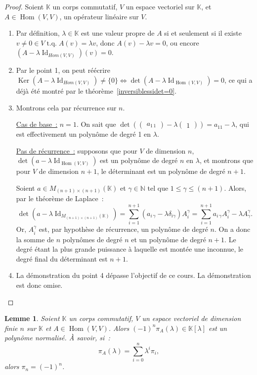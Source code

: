 \documentclass{article}
\DeclareMathOperator{\tq}{\text{ t.q. }}
\DeclareMathOperator{\Id}{Id}
\DeclareMathOperator{\Ker}{Ker}
\DeclareMathOperator{\Hom}{Hom}
\newcommand{\N}{\mathbb N}
\newcommand{\K}{\mathbb K}
\newcommand{\M}[3]{M_{#1 \times #2}(#3)}
\newtheorem{lem}[thm]{Lemme}
\theoremstyle{definition}
\theoremstyle{remark}
\begin{document}
		\begin{proof} Soient $\K$ un corps commutatif, $V$ un espace vectoriel sur $\K$, et $A \in \Hom(V, V)$, un opérateur linéaire sur $V$.

		\begin{enumerate}
			\item Par définition, $\lambda \in \K$ est une valeur propre de $A$ si et seulement si il existe $v \neq 0 \in V \tq A(v) = \lambda v$, donc
			      $A(v) - \lambda v = 0$, ou encore $(A - \lambda\Id_{Hom(V, V)})(v) = 0$.
			\item Par le point 1, on peut réécrire $\Ker(A - \lambda\Id_{Hom(V, V)}) \neq \{0\} \iff \det(A - \lambda \Id_{\Hom(V, V)}) = 0$, ce qui a déjà été montré
			      par le théorème~\ref{inversiblessidet=0}.
			\item Montrons cela par récurrence sur $n$.

			      \underline{Cas de base~:} $n = 1$. On sait que
				  $\det\left(\begin{pmatrix}a_{1\,1}\end{pmatrix} - \lambda\begin{pmatrix}1\end{pmatrix}\right) = a_11 - \lambda$, qui est effectivement un polynôme
				  de degré 1 en $\lambda$.

				  \underline{Pas de récurrence~:} supposons que pour $V$ de dimension $n$, $\det(a - \lambda \Id_{\Hom(V, V)})$ est un polynôme de degré $n$
				  en $\lambda$, et montrons que pour $V$ de dimension $n+1$, le déterminant est un polynôme de degré $n+1$.

				  Soient $a \in \M {(n+1)}{(n+1)}\K$ et $\gamma \in \N$ tel que $1 \leq \gamma \leq (n+1)$. Alors, par le théorème de Laplace~:
				  \[\det(a - \lambda \Id_{\M {(n+1)}{(n+1)}\K}) = \sum_{i=1}^{n+1}(a_{i\,\gamma} - \lambda\delta_{i\gamma})A_i^\gamma
				    = \sum_{i=1}^{n+1}a_{i\,\gamma}A_i^\gamma - \lambda A_\gamma^\gamma.\]
				  Or, $A_i^\gamma$ est, par hypothèse de récurrence, un polynôme de degré $n$. On a donc la somme de $n$ polynômes de degré $n$ et un polynôme
				  de degré $n+1$. Le degré étant la plus grande puissance à laquelle est montée une inconnue, le degré final du déterminant est $n+1$.
			\item La démonstration du point 4 dépasse l'objectif de ce cours. La démonstration est donc omise.
		\end{enumerate}
		\end{proof}

		\begin{lem}\label{polcarnorm} Soient $\K$ un corps commutatif, $V$ un espace vectoriel  de dimension finie $n$ sur $\K$ et $A \in \Hom(V, V)$. Alors
		$(-1)^n\pi_A(\lambda) \in \K[\lambda]$ est un polynôme normalisé. À savoir, si~:
		\[\pi_A(\lambda) = \sum_{i=0}^n\lambda^i\pi_i,\]
		alors $\pi_n = (-1)^n$. \end{lem}
\end{document}
